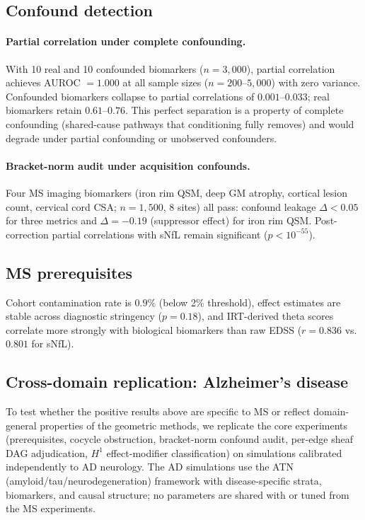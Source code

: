 \documentclass{article}
\begin{document}
\subsection{Confound detection}
\label{sec:res-confound}

\paragraph{Partial correlation under complete confounding.}
With 10 real and 10 confounded biomarkers ($n = 3{,}000$), partial correlation achieves AUROC $= 1.000$ at all sample sizes ($n = 200$--$5{,}000$) with zero variance.
Confounded biomarkers collapse to partial correlations of $0.001$--$0.033$; real biomarkers retain $0.61$--$0.76$.
This perfect separation is a property of complete confounding (shared-cause pathways that conditioning fully removes) and would degrade under partial confounding or unobserved confounders.

\paragraph{Bracket-norm audit under acquisition confounds.}
Four MS imaging biomarkers (iron rim QSM, deep GM atrophy, cortical lesion count, cervical cord CSA; $n = 1{,}500$, 8 sites) all pass: confound leakage $\Delta < 0.05$ for three metrics and $\Delta = -0.19$ (suppressor effect) for iron rim QSM.
Post-correction partial correlations with sNfL remain significant ($p < 10^{-55}$).

\subsection{MS prerequisites}

Cohort contamination rate is $0.9\%$ (below 2\% threshold), effect estimates are stable across diagnostic stringency ($p = 0.18$), and IRT-derived theta scores correlate more strongly with biological biomarkers than raw EDSS ($r = 0.836$ vs.\ $0.801$ for sNfL).

\subsection{Cross-domain replication: Alzheimer's disease}
\label{sec:ad}
\label{sec:res-ad}

To test whether the positive results above are specific to MS or reflect domain-general properties of the geometric methods, we replicate the core experiments (prerequisites, cocycle obstruction, bracket-norm confound audit, per-edge sheaf DAG adjudication, $H^1$ effect-modifier classification) on simulations calibrated independently to AD neurology.
The AD simulations use the ATN (amyloid/tau/neurodegeneration) framework \citep{jack2018niaaa} with disease-specific strata, biomarkers, and causal structure; no parameters are shared with or tuned from the MS experiments.
\end{document}
